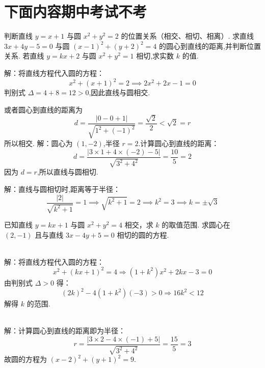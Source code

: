 \section{下面内容期中考试不考}
\begin{Exercise}[title={圆与直线位置关系练习1}, label={ex:line-circle}]
    \Question 判断直线 $ y = x + 1 $ 与圆 $ x^2 + y^2 = 2 $ 的位置关系（相交、相切、相离）.
    \Question 求直线 $ 3x + 4y - 5 = 0 $ 与圆 $ (x-1)^2 + (y+2)^2 = 4 $ 的圆心到直线的距离,并判断位置关系.
    \Question 若直线 $ y = kx + 2 $ 与圆 $ x^2 + y^2 = 1 $ 相切,求实数 $ k $ 的值.
\end{Exercise}
\begin{MyAnswer}[ref={ex:line-circle}]
        \Question 解：将直线方程代入圆的方程：
        $$
        x^2 + (x + 1)^2 = 2 \implies 2x^2 + 2x - 1 = 0
        $$
        判别式 $ \Delta = 4 + 8 = 12 > 0 $,因此直线与圆相交.

        或者圆心到直线的距离为 
        $$    
        d = \frac{|0-0+1|}{\sqrt{1^2 + (-1)^2}} = \frac{\sqrt{2}}{2} < \sqrt{2} =r
        $$
        所以相交.
        \Question 解：圆心为 $ (1, -2) $,半径 $ r = 2 $.计算圆心到直线的距离：
        $$
        d = \frac{|3 \times 1 + 4 \times (-2) - 5|}{\sqrt{3^2 + 4^2}} = \frac{10}{5} = 2
        $$
        因为 $ d = r $,所以直线与圆相切.

        \Question 解：直线与圆相切时,距离等于半径：
        $$
        \frac{|2|}{\sqrt{k^2 + 1}} = 1 \implies \sqrt{k^2 + 1} = 2 \implies k^2 = 3 \implies k = \pm \sqrt{3}
        $$
\end{MyAnswer}


\begin{Exercise}[title={圆与直线位置关系练习2}, label={ex:circle-line2}]
    \Question 已知直线 $y = kx + 1$ 与圆 $x^2 + y^2 = 4$ 相交，求 $k$ 的取值范围.
    \Question 求圆心在 $(2,-1)$ 且与直线 $3x - 4y + 5 = 0$ 相切的圆的方程.
\end{Exercise}

\begin{MyAnswer}[ref={ex:circle-line2}]


    \Question {}\\ 
    解：将直线方程代入圆的方程：
    $$
    x^2 + (kx + 1)^2 = 4 \Rightarrow (1 + k^2)x^2 + 2kx - 3 = 0
    $$
    由判别式 $\Delta > 0$ 得：
    $$
    (2k)^2 - 4(1 + k^2)(-3) > 0 \Rightarrow 16k^2 < 12
    $$
    解得 $k$ 的范围.

    \Question {}\\ 
    解：计算圆心到直线的距离即为半径：
    $$
    r = \frac{|3 \times 2 - 4 \times (-1) + 5|}{\sqrt{3^2 + 4^2}} = \frac{15}{5} = 3
    $$
    故圆的方程为 $(x-2)^2 + (y+1)^2 = 9$.
\end{MyAnswer}
